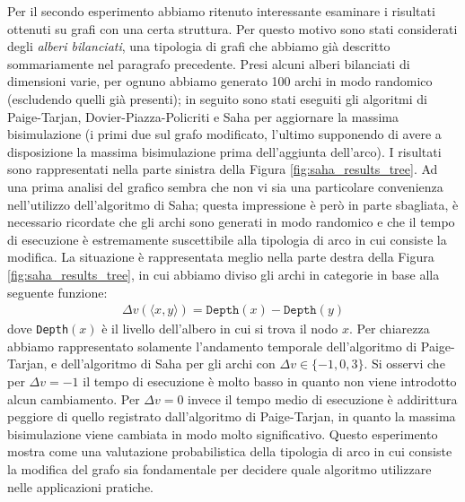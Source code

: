 Per il secondo esperimento abbiamo ritenuto interessante esaminare i risultati ottenuti su grafi con una certa struttura. Per questo motivo sono stati considerati degli \emph{alberi bilanciati}, una tipologia di grafi che abbiamo già descritto sommariamente nel paragrafo precedente. Presi alcuni alberi bilanciati di dimensioni varie, per ognuno abbiamo generato 100 archi in modo randomico (escludendo quelli già presenti); in seguito sono stati eseguiti gli algoritmi di Paige-Tarjan, Dovier-Piazza-Policriti e Saha per aggiornare la massima bisimulazione (i primi due sul grafo modificato, l'ultimo supponendo di avere a disposizione la massima bisimulazione prima dell'aggiunta dell'arco). I risultati sono rappresentati nella parte sinistra della Figura \ref{fig:saha_results_tree}. Ad una prima analisi del grafico sembra che non vi sia una particolare convenienza nell'utilizzo dell'algoritmo di Saha; questa impressione è però in parte sbagliata, è necessario ricordate che gli archi sono generati in modo randomico e che il tempo di esecuzione è estremamente suscettibile alla tipologia di arco in cui consiste la modifica. La situazione è rappresentata meglio nella parte destra della Figura \ref{fig:saha_results_tree}, in cui abbiamo diviso gli archi in categorie in base alla seguente funzione:
\begin{gather*}
    \Delta v(\langle x,y \rangle) = \texttt{Depth}(x) - \texttt{Depth}(y)
\end{gather*}
dove \texttt{Depth}$(x)$ è il livello dell'albero in cui si trova il nodo $x$. Per chiarezza abbiamo rappresentato solamente l'andamento temporale dell'algoritmo di Paige-Tarjan, e dell'algoritmo di Saha per gli archi con $\Delta v \in \{-1,0,3\}$. Si osservi che per $\Delta v = -1$ il tempo di esecuzione è molto basso in quanto non viene introdotto alcun cambiamento. Per $\Delta v = 0$ invece il tempo medio di esecuzione è addirittura peggiore di quello registrato dall'algoritmo di Paige-Tarjan, in quanto la massima bisimulazione viene cambiata in modo molto significativo. Questo esperimento mostra come una valutazione probabilistica della tipologia di arco in cui consiste la modifica del grafo sia fondamentale per decidere quale algoritmo utilizzare nelle applicazioni pratiche.

